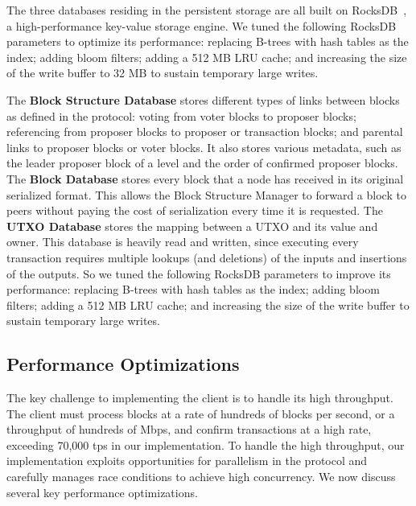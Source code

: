 The three databases residing in the persistent storage are all built on RocksDB~\cite{rocksdb}, a high-performance key-value storage engine. We tuned the following RocksDB parameters to optimize its performance: replacing B-trees with hash tables as the index; adding bloom filters; adding a 512 MB LRU cache; and increasing the size of the write buffer to 32 MB to sustain temporary large writes. 


The \textbf{Block Structure Database} stores different types of links between blocks as defined in the \prism protocol: voting from voter blocks to proposer blocks; referencing from proposer blocks to proposer or transaction blocks; and parental links to proposer blocks or voter blocks. It also stores various metadata, such as the leader proposer block of a level and the order of confirmed proposer blocks. 
The \textbf{Block Database} stores every block that a node has received in its original serialized format. This allows the Block Structure Manager to forward a block to peers without paying the cost of serialization every time it is requested. The \textbf{UTXO Database} stores the mapping between a UTXO and its value and owner. This database is heavily read and written, since executing every transaction requires multiple lookups (and deletions) of the inputs and insertions of the outputs. So we tuned the following RocksDB parameters to improve its performance: replacing B-trees with hash tables as the index; adding bloom filters; adding a 512 MB LRU cache; and increasing the size of the write buffer to sustain temporary large writes. 


\fi

\subsection{Performance Optimizations}

\label{sec:implementation-highlights}

The key challenge to implementing the \prism client is to handle its high throughput. The client must process blocks at a rate of hundreds of blocks per second, or a throughput of hundreds of Mbps, and confirm transactions at a high rate, exceeding 70,000 tps in our implementation. To handle the high throughput, our implementation exploits opportunities for parallelism in the protocol and carefully manages race conditions to achieve high concurrency. We now discuss several key performance optimizations. 

